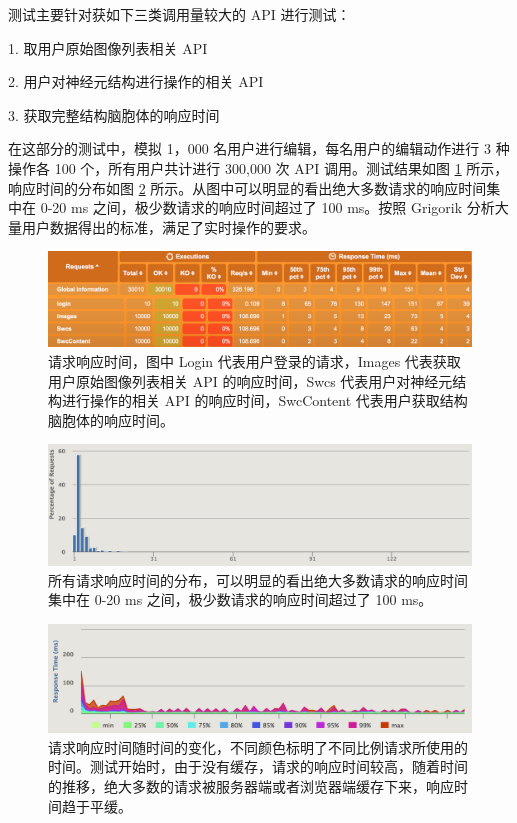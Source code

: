 测试主要针对获如下三类调用量较大的 API 进行测试：

1. 取用户原始图像列表相关 API

2. 用户对神经元结构进行操作的相关 API

3. 获取完整结构脑胞体的响应时间

在这部分的测试中，模拟 1，000 名用户进行编辑，每名用户的编辑动作进行 3 种操作各 100 个，所有用户共计进行 300,000 次 API 调用。测试结果如图 \ref{response} 所示，响应时间的分布如图 \ref{responsedis} 所示。从图中可以明显的看出绝大多数请求的响应时间集中在 0-20 ms 之间，极少数请求的响应时间超过了 100 ms。按照 Grigorik 分析大量用户数据得出的标准，满足了实时操作的要求。

\begin{figure}[!ht]
\centering
\includegraphics[width=148mm]{images/response}
\caption{请求响应时间，图中 Login 代表用户登录的请求，Images 代表获取用户原始图像列表相关 API 的响应时间，Swcs 代表用户对神经元结构进行操作的相关 API 的响应时间，SwcContent 代表用户获取结构脑胞体的响应时间。}
\label{response}
\end{figure}

\begin{figure}[!ht]
\centering
\includegraphics[width=148mm]{images/responsedis}
\caption{所有请求响应时间的分布，可以明显的看出绝大多数请求的响应时间集中在 0-20 ms 之间，极少数请求的响应时间超过了 100 ms。}
\label{responsedis}
\end{figure}

\begin{figure}[!ht]
\centering
\includegraphics[width=148mm]{images/responsetime}
\caption{请求响应时间随时间的变化，不同颜色标明了不同比例请求所使用的时间。测试开始时，由于没有缓存，请求的响应时间较高，随着时间的推移，绝大多数的请求被服务器端或者浏览器端缓存下来，响应时间趋于平缓。}
\label{responsetime}
\end{figure}


